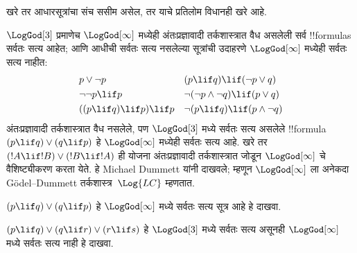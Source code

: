 \documentclass[../../../include/open-logic-section]{subfiles}
\begin{document}
खरे तर आधारसूत्रांचा संच ससीम असेल, तर याचे प्रतिलोम
विधानही खरे आहे.

$\LogGod[3]$ प्रमाणेच $\LogGod[\infty]$ मध्येही
अंतःप्रज्ञावादी तर्कशास्त्रात वैध असलेली सर्व !!{formula}s
सर्वतः सत्य आहेत; आणि आधीची सर्वतः सत्य नसलेल्या सूत्रांची
उदाहरणे $\LogGod[\infty]$ मध्येही सर्वतः सत्य नाहीत:
\begin{align*}
  & p \lor \lnot p && (p \lif q) \lif (\lnot p \lor q) \\
  & \lnot\lnot p \lif p && \lnot(\lnot p \land \lnot q) \lif (p \lor q) \\
  & ((p \lif q) \lif p) \lif p && \lnot(p \lif q) \lif (p \land \lnot q)
\end{align*}
अंतःप्रज्ञावादी तर्कशास्त्रात वैध नसलेले, पण
$\LogGod[3]$ मध्ये सर्वतः सत्य असलेले
!!{formula}~$(p \lif q) \lor (q \lif p)$ हे
$\LogGod[\infty]$ मध्येही सर्वतः सत्य आहे. खरे तर
$(!A \lif !B) \lor (!B \lif !A)$ ही योजना
अंतःप्रज्ञावादी तर्कशास्त्रात जोडून $\LogGod[\infty]$
चे वैशिष्ट्यीकरण करता येते. हे Michael Dummett यांनी
दाखवले; म्हणून $\LogGod[\infty]$ ला अनेकदा
G\"odel--Dummett तर्कशास्त्र~$\Log{LC}$ म्हणतात.

\begin{prob}
  $(p \lif q) \lor (q \lif p)$ हे $\LogGod[\infty]$
  मध्ये सर्वतः सत्य सूत्र आहे हे दाखवा.
\end{prob}

\begin{prob}
  $(p \lif q) \lor (q \lif r) \lor (r \lif s)$ हे
  $\LogGod[3]$ मध्ये सर्वतः सत्य असूनही
  $\LogGod[\infty]$ मध्ये सर्वतः सत्य नाही हे दाखवा.
\end{prob}
\end{document}
